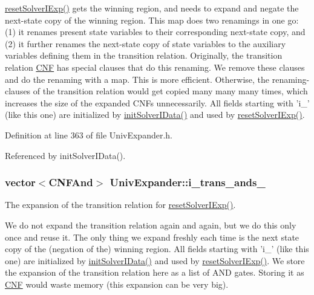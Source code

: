\hyperlink{classUnivExpander_a1d6935778cefc0b441db0d7f16933a48}{reset\-Solver\-I\-Exp()} gets the winning region, and needs to expand and negate the next-\/state copy of the winning region. This map does two renamings in one go\-: (1) it renames present state variables to their corresponding next-\/state copy, and (2) it further renames the next-\/state copy of state variables to the auxiliary variables defining them in the transition relation. Originally, the transition relation \hyperlink{classCNF}{C\-N\-F} has special clauses that do this renaming. We remove these clauses and do the renaming with a map. This is more efficient. Otherwise, the renaming-\/clauses of the transition relation would get copied many many many times, which increases the size of the expanded C\-N\-Fs unnecessarily. All fields starting with 'i\-\_\-' (like this one) are initialized by \hyperlink{classUnivExpander_a87f2309e7e1d511d9539872b08814c40}{init\-Solver\-I\-Data()} and used by \hyperlink{classUnivExpander_a1d6935778cefc0b441db0d7f16933a48}{reset\-Solver\-I\-Exp()}. 

Definition at line 363 of file Univ\-Expander.\-h.



Referenced by init\-Solver\-I\-Data().

\hypertarget{classUnivExpander_a9de6c3dba22507de35c5d5750612e423}{
\subsubsection[{i\-\_\-trans\-\_\-ands\-\_\-}]{\setlength{\rightskip}{0pt plus 5cm}vector$<${\bf C\-N\-F\-And}$>$ Univ\-Expander\-::i\-\_\-trans\-\_\-ands\-\_\-\hspace{0.3cm}{\ttfamily [protected]}}}\label{classUnivExpander_a9de6c3dba22507de35c5d5750612e423}


The expansion of the transition relation for \hyperlink{classUnivExpander_a1d6935778cefc0b441db0d7f16933a48}{reset\-Solver\-I\-Exp()}. 

We do not expand the transition relation again and again, but we do this only once and reuse it. The only thing we expand freshly each time is the next state copy of the (negation of the) winning region. All fields starting with 'i\-\_\-' (like this one) are initialized by \hyperlink{classUnivExpander_a87f2309e7e1d511d9539872b08814c40}{init\-Solver\-I\-Data()} and used by \hyperlink{classUnivExpander_a1d6935778cefc0b441db0d7f16933a48}{reset\-Solver\-I\-Exp()}. We store the expansion of the transition relation here as a list of A\-N\-D gates. Storing it as \hyperlink{classCNF}{C\-N\-F} would waste memory (this expansion can be very big). 

